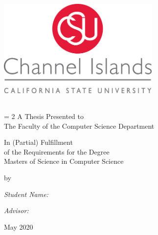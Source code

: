 \begin{titlepage}
\begin{center}
\includegraphics[width=0.60\textwidth]{media/correctlogo.jpg}~\\


\HRule \\[0.5cm]
{\Large \bfseries \thesistitle \par}

\vspace{0.5 cm}

\baselineskip = 2\baselineskip
A Thesis Presented to \\
The Faculty of the Computer Science Department

\vspace{0.5 cm}

In (Partial) Fulfillment\\
of the Requirements for the Degree\\
Masters of Science in Computer Science\\

\vspace{0.5 cm }


by \\

\begin{minipage}{0.4\textwidth}
\begin{flushleft} \small
\emph{Student Name:}\\
\textsc{\studentname}
\end{flushleft}
\end{minipage}
\begin{minipage}{0.4\textwidth}
\begin{flushright} \small
\emph{Advisor:} \\
\textsc{\advisorname}
\end{flushright}
\end{minipage}

May 2020\\
\HRule \\[1.0cm]
\end{center}
\end{titlepage}